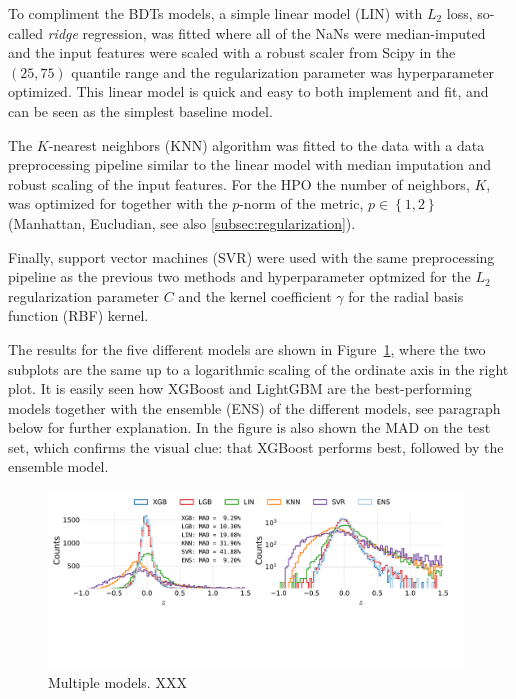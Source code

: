 To compliment the BDTs models, a simple linear model (LIN) with $L_2$ loss, so-called \emph{ridge} regression, was fitted where all of the NaNs were median-imputed and the input features were scaled with a robust scaler from Scipy \autocite{virtanenSciPyFundamentalAlgorithms2019} in the $(25, 75)$ quantile range and the regularization parameter was hyperparameter optimized. This linear model is quick and easy to both implement and fit, and can be seen as the simplest baseline model.

The $K$-nearest neighbors (KNN) algorithm was fitted to the data with a data preprocessing pipeline similar to the linear model with median imputation and robust scaling of the input features. For the HPO the number of neighbors, $K$, was optimized for together with the $p$-norm of the metric, $p \in \left\{ 1, 2\right\}$ (Manhattan, Eucludian, see also \autoref{subsec:regularization}).

Finally, support vector machines (SVR) were used with the same preprocessing pipeline as the previous two methods and hyperparameter optmized for the $L_2$ regularization parameter $C$ and the kernel coefficient $\gamma$ for the radial basis function (RBF) kernel. 

The results for the five different models are shown in Figure~\ref{fig:h:multiple_models}, where the two subplots are the same up to a logarithmic scaling of the ordinate axis in the right plot. It is easily seen how XGBoost and LightGBM are the best-performing models together with the ensemble (ENS) of the different models, see paragraph below for further explanation. In the figure is also shown the MAD on the test set, which confirms the visual clue: that XGBoost performs best, followed by the ensemble model.

\begin{figure}[ht!]
  \centerfloat
  \includegraphics[draft, width=0.98\textwidth, trim=10 130 40 10, clip]{figures/housing/Ejerlejlighed_v19_cut_all_Ncols_all_all_models.pdf}
  \caption[Multiple Models XXX]
          {Multiple models. XXX
          } 
  \label{fig:h:multiple_models}
\end{figure}


